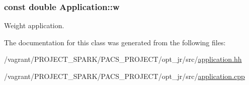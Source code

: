 \hypertarget{classApplication_a89e171cf287b09ce4b37dd94c0d61e2b}{
\subsubsection[{w}]{\setlength{\rightskip}{0pt plus 5cm}const double Application\-::w\hspace{0.3cm}{\ttfamily [private]}}}\label{classApplication_a89e171cf287b09ce4b37dd94c0d61e2b}


Weight application. 



The documentation for this class was generated from the following files\-:\begin{DoxyCompactItemize}
\item 
/vagrant/\-P\-R\-O\-J\-E\-C\-T\-\_\-\-S\-P\-A\-R\-K/\-P\-A\-C\-S\-\_\-\-P\-R\-O\-J\-E\-C\-T/opt\-\_\-jr/src/\hyperlink{application_8hh}{application.\-hh}\item 
/vagrant/\-P\-R\-O\-J\-E\-C\-T\-\_\-\-S\-P\-A\-R\-K/\-P\-A\-C\-S\-\_\-\-P\-R\-O\-J\-E\-C\-T/opt\-\_\-jr/src/\hyperlink{application_8cpp}{application.\-cpp}\end{DoxyCompactItemize}
